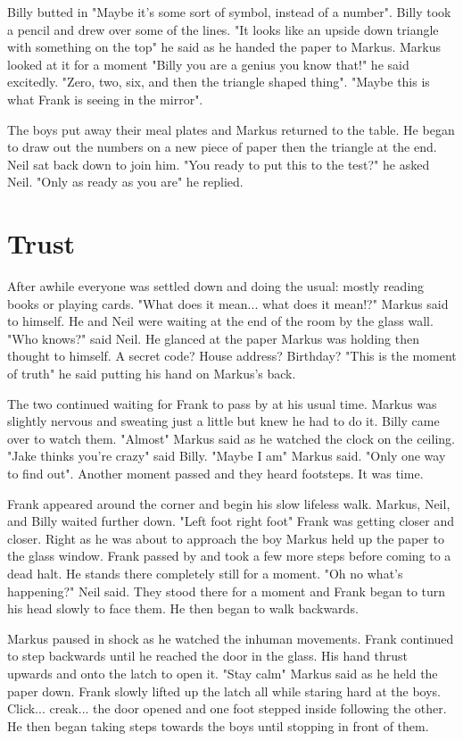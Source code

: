 \documentclass[12pt]{book}
\begin{document}
Billy butted in "Maybe it's some sort of symbol, instead of a number". Billy took a pencil and drew over some of the lines. "It looks like an upside down triangle with something on the top" he said as he handed the paper to Markus. Markus looked at it for a moment "Billy you are a genius you know that!" he said excitedly. "Zero, two, six, and then the triangle shaped thing". "Maybe this is what Frank is seeing in the mirror".

The boys put away their meal plates and Markus returned to the table. He began to draw out the numbers on a new piece of paper then the triangle at the end. Neil sat back down to join him. "You ready to put this to the test?" he asked Neil. "Only as ready as you are" he replied.

\chapter{Trust}

After awhile everyone was settled down and doing the usual: mostly reading books or playing cards. "What does it mean... what does it mean!?" Markus said to himself. He and Neil were waiting at the end of the room by the glass wall. "Who knows?" said Neil. He glanced at the paper Markus was holding then thought to himself. A secret code? House address? Birthday? "This is the moment of truth" he said putting his hand on Markus's back.

The two continued waiting for Frank to pass by at his usual time. Markus was slightly nervous and sweating just a little but knew he had to do it. Billy came over to watch them. "Almost" Markus said as he watched the clock on the ceiling. "Jake thinks you're crazy" said Billy. "Maybe I am" Markus said. "Only one way to find out". Another moment passed and they heard footsteps. It was time.

Frank appeared around the corner and begin his slow lifeless walk. Markus, Neil, and Billy waited further down. "Left foot right foot" Frank was getting closer and closer. Right as he was about to approach the boy Markus held up the paper to the glass window. Frank passed by and took a few more steps before coming to a dead halt. He stands there completely still for a moment. "Oh no what's happening?" Neil said. They stood there for a moment and Frank began to turn his head slowly to face them. He then began to walk backwards.

Markus paused in shock as he watched the inhuman movements. Frank continued to step backwards until he reached the door in the glass. His hand thrust upwards and onto the latch to open it. "Stay calm" Markus said as he held the paper down. Frank slowly lifted up the latch all while staring hard at the boys. Click... creak... the door opened and one foot stepped inside following the other. He then began taking steps towards the boys until stopping in front of them.
\end{document}
